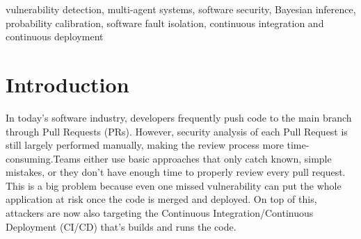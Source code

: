 \documentclass[conference]{IEEEtran}
\begin{document}
\begin{abstract}
Modern software development increasingly relies on Continuous
Integration/Continuous Deployment (CI/CD) pipelines to deliver software
rapidly, but automated security review at the pull request stage remains
limited. Existing security tools rely on rigid static analysis or
homogeneous multi-agent approaches, which may generate false positives or
overlook complex vulnerabilities, and they report a verdict without any
measure of how often that verdict is right. This paper presents
CodeSheriff, an agentic security auditor that analyzes GitHub pull requests
using structural, semantic, contextual, and SFI-based confidential
execution analysis. A Bayesian inference engine fuses evidence from the
four agents into a calibrated vulnerability probability, and an automated
patch generation and verification module recommends and validates fixes
through GitHub and a web dashboard. On a labelled corpus of 76 Python
functions arranged as 38 vulnerable--safe twin pairs, CodeSheriff attains
an $F_1$ of $0.923$ at a precision of $1.000$ with an expected calibration
error of $0.027$, while majority voting over identical agent evidence
attains an $F_1$ of only $0.142$ at five times the calibration error. The
system therefore delivers reliable, explainable, and statistically grounded
vulnerability detection while reducing manual review effort.
\end{abstract}
\vspace{6pt}
\begin{IEEEkeywords}
vulnerability detection, multi-agent systems, software security, Bayesian
inference, probability calibration, software fault isolation, continuous
integration and continuous deployment
\end{IEEEkeywords}


\section{Introduction}
In today’s software industry, developers frequently push code to the main branch through Pull Requests (PRs). However, security analysis of each Pull Request is still largely performed manually, making the review process more time-consuming.Teams either use basic approaches that only catch known, simple mistakes, or they don't have enough time to properly review every pull request. This is a big problem because even one missed vulnerability can put the whole application at risk once the code is merged and deployed. On top of this, attackers are now also targeting the Continuous Integration/Continuous Deployment (CI/CD) that's builds and runs the code.
\end{document}
